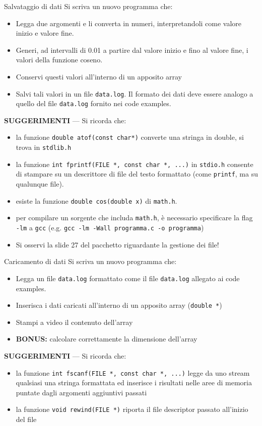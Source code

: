 \documentclass{beamer}
\begin{document}
\begin{frame}[fragile]{Salvataggio di dati}
Si scriva un nuovo programma che:
\begin{itemize}
 \item Legga due argomenti e li converta in numeri, interpretandoli come valore inizio e valore fine.
 \item Generi, ad intervalli di 0.01 a partire dal valore inizio e fino al valore fine, i valori della funzione coseno.
 \item Conservi questi valori all'interno di un apposito array
 \item Salvi tali valori in un file \texttt{data.log}. Il formato dei dati deve essere analogo a quello del file \texttt{data.log} fornito nei code examples.
\end{itemize}
\scriptsize
\textbf{SUGGERIMENTI} --- Si ricorda che:
\begin{itemize}
 \item la funzione \texttt{double atof(const char*)} converte una stringa in double, si trova in \texttt{stdlib.h}
 \item la funzione \texttt{int fprintf(FILE *, const char *, ...)} in \texttt{stdio.h} consente di stampare su un descrittore di file del testo formattato (come \texttt{printf}, ma su qualunque file).
 \item esiste la funzione \texttt{double cos(double x)} di \texttt{math.h}.
 \item per compilare un sorgente che includa \texttt{math.h}, è necessario specificare la flag \texttt{-lm} a \texttt{gcc} (e.g. \texttt{gcc -lm -Wall programma.c -o programma})
 \item Si osservi la slide 27 del pacchetto riguardante la gestione dei file!
\end{itemize}
\end{frame}

\begin{frame}[fragile]{Caricamento di dati}
Si scriva un nuovo programma che:
\begin{itemize}
 \item Legga un file \texttt{data.log} formattato come il file \texttt{data.log} allegato ai code examples.
 \item Inserisca i dati caricati all'interno di un apposito array (\texttt{double *})
 \item Stampi a video il contenuto dell'array
 \item \textbf{BONUS:} calcolare correttamente la dimensione dell'array
\end{itemize}
\scriptsize
\textbf{SUGGERIMENTI} --- Si ricorda che:
\begin{itemize}
 \item la funzione \texttt{int fscanf(FILE *, const char *, ...)} legge da uno stream qualsiasi una stringa formattata ed inserisce i risultati nelle aree di memoria puntate dagli argomenti aggiuntivi passati
 \item la funzione \texttt{void rewind(FILE *)} riporta il file descriptor passato all'inizio del file
\end{itemize}
\end{frame}
\end{document}
